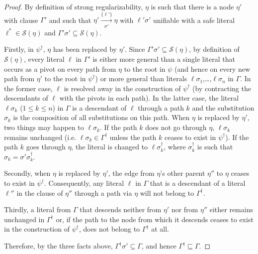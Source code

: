 \begin{proof} 
By definition of strong regularizability, $\eta$ is such
that there is a node $\eta'$ with clause $\Gamma'$ and such that
$\eta' \xrightarrow[\sigma']{\{\ell'\} } \eta$ with $\ell'\sigma'$
unifiable with a safe literal $\ell^*\in \mathcal{S}(\eta)$ and
$\Gamma' \sigma' \subseteq \mathcal{S}(\eta)$.

Firstly, in $\psi^{\dagger}$, $\eta$ has been replaced by $\eta'$. Since
$\Gamma' \sigma' \subseteq \mathcal{S}(\eta)$, by definition of
$\mathcal{S}(\eta)$, every literal $\ell$ in $\Gamma'$ is either more
general than a single literal that occurs as a pivot on every path
from $\eta$ to the root in $\psi$ (and hence on every new path from
$\eta'$ to the root in $\psi^{\dagger}$) or more general than literals
$\ell \sigma_1$,\ldots,$\ell\sigma_n$ in $\Gamma$. In the former case,
$\ell$ is resolved away in the construction of $\psi^{\dagger}$ (by
contracting the descendants of $\ell$ with the pivots in each path).
In the latter case, the literal $\ell \sigma_k$ ($1 \leq k \leq n$) in
$\Gamma$ is a descendant of $\ell$ through a path $k$ and the
substitution $\sigma_k$ is the composition of all substitutions on
this path. When $\eta$ is replaced by $\eta'$, two things may happen
to $\ell \sigma_k$. If the path $k$ does not go through $\eta$, 
$\ell \sigma_k$ remains unchanged (i.e. $\ell \sigma_k \in \Gamma^{\dagger}$
unless the path $k$ ceases to exist in $\psi^{\dagger}$). If the path
$k$ goes through $\eta$, the literal is changed to 
$\ell\sigma^{\dagger}_k$, where $\sigma^{\dagger}_k$ is such that 
$\sigma_k = \sigma' \sigma^{\dagger}_k$.

Secondly, when $\eta$ is replaced by $\eta'$, the edge from
$\eta$'s other parent $\eta''$ to $\eta$ ceases to exist in
$\psi^{\dagger}$. Consequently, any literal $\ell$ in $\Gamma$ that is a
descendant of a literal $\ell''$ in the clause of $\eta''$ through a
path via $\eta$ will not belong to $\Gamma^{\dagger}$.


Thirdly, a literal from $\Gamma$ that descends neither from $\eta'$ nor from $\eta''$ either remains unchanged in $\Gamma^{\dagger}$ or, if the path to the node from which it descends ceases to exist in the construction of $\psi^{\dagger}$, does not belong to $\Gamma^{\dagger}$ at all.

Therefore, by the three facts above, $\Gamma^{\dagger} \sigma' \subseteq \Gamma$, and hence $\Gamma^{\dagger} \sqsubseteq \Gamma$.
\end{proof}


